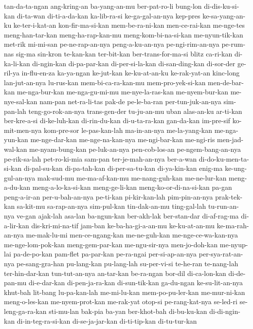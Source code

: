 {tan-da-ta-ngan ang-kring-an ba-yang-an-mu ber-pat-ro-li bung-lon di-dis-ku-si-kan di-ta-wan di-ti-a-da-kan
ka-lib-ra-si ke-ga-gal-an-nya kep-pres ke-sa-yang-an-ku ke-ter-i-kat-an kon-fir-ma-si-kan mem-be-ra-ni-kan men-ce-rai-kan
me-nge-tes meng-han-tar-kan meng-ha-rap-kan-mu meng-kom-bi-na-si-kan me-nyun-tik-kan met-rik mi-mi-san pe-ne-rap-an-nya
peng-a-ku-an-nya pe-ngi-rim-an-nya pe-rum-nas sig-ma sin-kron te-kan-kan ter-bit-kan ber-trans-for-ma-si
blitz ca-ri-kan di-ka-li-kan di-ngin-kan di-pa-par-kan di-per-si-la-kan di-san-ding-kan di-sor-der
ge-ril-ya in-flu-en-za ka-ya-ngan ke-jut-kan ke-ku-at-an-ku ke-rak-yat-an kinc-long lan-jut-an-nya
lu-rus-kan mem-bi-ca-ra-kan-mu mem-pro-yek-si-kan men-de-bar-kan me-nga-bur-kan me-nga-gu-mi-mu me-nye-la-ras-kan me-nyem-bur-kan
me-nye-sal-kan nam-pan net-ra-li-tas pak-de pe-le-ba-ran per-tun-juk-an-nya sim-pan-lah teng-go-rok-an-nya
trans-gen-der tu-ju-an-mu uban alas-an-ku ar-ti-kan ber-kre-a-si di-ke-luh-kan di-rin-du-kan
di-u-ta-ra-kan gan-da-kan im-pre-sif ko-mit-men-nya kom-pre-sor le-pas-kan-lah ma-in-an-nya me-la-yang-kan
me-nga-yun-kan me-nge-dar-kan me-nge-na-kan-nya me-ngi-bar-kan me-ngi-ris men-jad-wal-kan me-nyam-bung-kan pe-luk-an-nya
pen-cob-los-an pe-ngem-bang-an-nya pe-rik-sa-lah pet-ro-ki-mia sam-pan ter-je-mah-an-nya ber-a-wan di-do-ku-men-ta-si-kan
di-pal-su-kan di-pa-tah-kan di-per-sa-tu-kan di-ya-kin-kan enig-ma ke-ung-gul-an-nya mak-sud-mu me-ma-af-kan-mu
me-nang-guh-kan me-ne-lur-kan meng-a-du-kan meng-a-lo-ka-si-kan meng-ge-li-kan meng-ko-or-di-na-si-kan pa-gan peng-a-ir-an
per-u-bah-an-nya pe-ti-kan pi-kir-kan-lah pim-pin-an-nya prak-tek-kan sa-kit-mu sa-rap-an-nya sim-pul-kan
tin-dak-an-mu ting-gal-lah tu-run-an-nya ve-gan ajak-lah asa-lan ba-ngun-kan ber-akh-lak
ber-stan-dar di-af-rag-ma di-a-lir-kan dis-kri-mi-na-tif jam-ban ke-ba-ha-gi-a-an-mu ke-ku-at-an-mu ke-ma-rah-an-nya
me-mak-lu-mi men-ce-ngang-kan me-ne-guh-kan me-nge-ce-wa-kan-nya me-nge-lom-pok-kan meng-gem-par-kan me-ngu-sir-nya men-jo-doh-kan
me-nyup-lai pa-de-po-kan pam-flet pa-par-kan pe-ra-ngai per-si-ap-an-nya per-sya-rat-an-nya pe-sang-gra-han
pu-lang-kan pu-lang-lah su-per-vi-si te-he-ran te-nang-lah ter-hin-dar-kan tun-tut-an-nya an-tar-kan
be-ra-ngan bor-dil di-ca-lon-kan di-de-pan-mu di-e-dar-kan di-pen-ja-ra-kan di-sun-tik-kan ga-du-ngan
ke-su-lit-an-nya khut-bah lit-bang lu-pa-kan-lah me-mi-lu-kan mem-po-pu-ler-kan me-mur-ni-kan meng-o-les-kan
me-nyem-prot-kan me-rak-yat otop-si pe-rang-kat-nya se-led-ri se-leng-ga-ra-kan sti-mu-lan bak-pia
ba-yan ber-khot-bah di-bu-ku-kan di-di-ngin-kan di-in-teg-ra-si-kan di-se-ja-jar-kan di-ti-tip-kan di-tu-tur-kan
}
